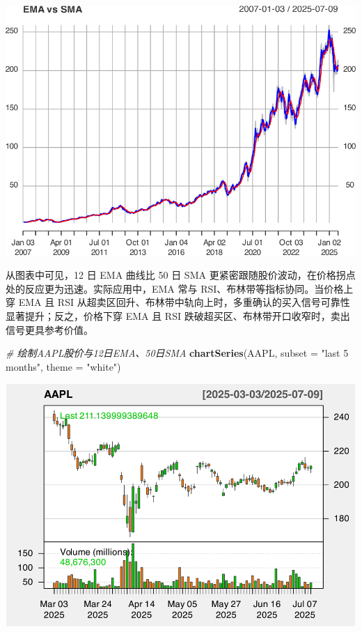 \documentclass[]{ctexbook}
\newenvironment{Shaded}{\begin{snugshade}}{\end{snugshade}}
\newcommand{\AttributeTok}[1]{\textcolor[rgb]{0.13,0.29,0.53}{#1}}
\newcommand{\CommentTok}[1]{\textcolor[rgb]{0.56,0.35,0.01}{\textit{#1}}}
\newcommand{\FunctionTok}[1]{\textcolor[rgb]{0.13,0.29,0.53}{\textbf{#1}}}
\newcommand{\NormalTok}[1]{#1}
\newcommand{\StringTok}[1]{\textcolor[rgb]{0.31,0.60,0.02}{#1}}
\begin{document}
\includegraphics[width=0.9\linewidth]{quantmod_files/figure-latex/ema-6}

从图表中可见，12 日 EMA 曲线比 50 日 SMA 更紧密跟随股价波动，在价格拐点处的反应更为迅速。实际应用中，EMA 常与 RSI、布林带等指标协同。当价格上穿 EMA 且 RSI 从超卖区回升、布林带中轨向上时，多重确认的买入信号可靠性显著提升；反之，价格下穿 EMA 且 RSI 跌破超买区、布林带开口收窄时，卖出信号更具参考价值。

\begin{Shaded}
\begin{Highlighting}[]
\CommentTok{\# 绘制AAPL股价与12日EMA、50日SMA}
\FunctionTok{chartSeries}\NormalTok{(AAPL, }\AttributeTok{subset =} \StringTok{"last 5 months"}\NormalTok{, }\AttributeTok{theme =} \StringTok{"white"}\NormalTok{)}
\end{Highlighting}
\end{Shaded}

\includegraphics[width=0.9\linewidth]{quantmod_files/figure-latex/ema_2-1}
\end{document}
